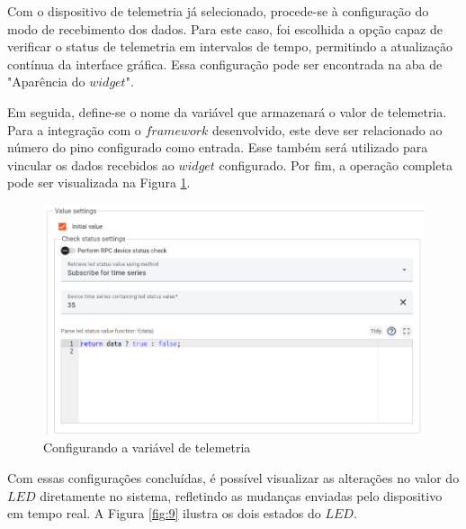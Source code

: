 \documentclass{ecatfg}
\begin{document}
Com o dispositivo de telemetria já selecionado, procede-se à configuração do modo de recebimento dos dados. Para este caso, foi escolhida a opção capaz de verificar o status de telemetria em intervalos de tempo, permitindo a atualização contínua da interface gráfica. Essa configuração pode ser encontrada na aba de "Aparência do $widget$". \par

Em seguida, define-se o nome da variável que armazenará o valor de telemetria. Para a integração com o $framework$ desenvolvido, este deve ser relacionado ao número do pino configurado como entrada. Esse também será utilizado para vincular os dados recebidos ao $widget$ configurado. Por fim, a operação completa pode ser visualizada na Figura \ref{fig:8}.

\begin{figure}[!htb]
    \centering
    \includegraphics[scale=0.2]{Figuras/config_variavel.png}
    \caption{Configurando a variável de telemetria}
    \label{fig:8}
\end{figure}

Com essas configurações concluídas, é possível visualizar as alterações no valor do $LED$ diretamente no sistema, refletindo as mudanças enviadas pelo dispositivo em tempo real. A Figura \ref{fig:9} ilustra os dois estados do $LED$.
\end{document}
